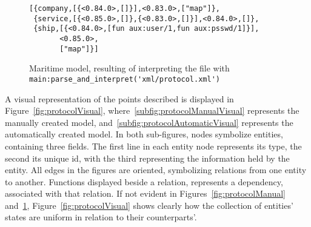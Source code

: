 \begin{figure}[h]
  \begin{lstlisting}[keywordstyle={}]
[{company,[{<0.84.0>,[]}],<0.83.0>,["map"]},
 {service,[{<0.85.0>,[]},{<0.83.0>,[]}],<0.84.0>,[]},
 {ship,[{<0.84.0>,[fun aux:user/1,fun aux:psswd/1]}],
       <0.85.0>,
       ["map"]}]
  \end{lstlisting}
  \caption{Maritime model, resulting of interpreting the file  with \lstinline{main:parse_and_interpret('xml/protocol.xml')}}
  \label{fig:protocolAutomatic}
\end{figure}

\noindent
A visual representation of the points described is displayed in Figure~\ref{fig:protocolVisual}, where~\ref{subfig:protocolManualVisual} represents the manually created model, and~\ref{subfig:protocolAutomaticVisual} represents the automatically created model. In both sub-figures, nodes symbolize entities, containing three fields. The first line in each entity node represents its type, the second its unique id, with the third representing the information held by the entity. All edges in the figures are oriented, symbolizing relations from one entity to another. Functions displayed beside a relation, represents a dependency, associated with that relation. If not evident in Figures~\ref{fig:protocolManual} and~\ref{fig:protocolAutomatic}, Figure~\ref{fig:protocolVisual} shows clearly how the collection of entities' states are uniform in relation to their counterparts'.

